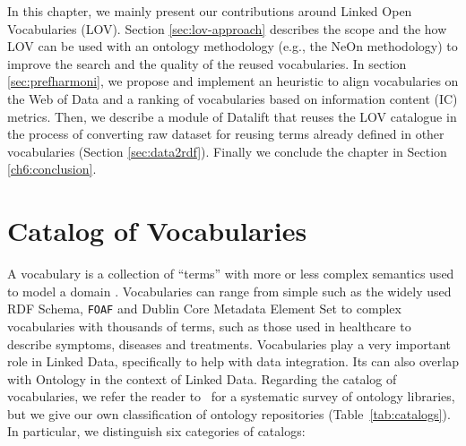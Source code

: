 In this chapter, we mainly present our contributions around Linked Open Vocabularies (LOV). Section \ref{sec:lov-approach} describes the scope and the how LOV can be used with an ontology methodology (e.g., the NeOn methodology) to improve the search and the quality of the reused vocabularies. In section \ref{sec:prefharmoni}, we propose and implement an heuristic to align vocabularies on the Web of Data and a ranking of vocabularies based on information content (IC) metrics. Then, we describe a module of Datalift that reuses the LOV catalogue in the process of converting raw dataset for reusing terms already defined in other vocabularies (Section \ref{sec:data2rdf}). Finally we  conclude the chapter in Section \ref{ch6:conclusion}.

\section{Catalog of Vocabularies}
\label{sec:catalog}
A vocabulary is a collection of ``terms'' with more or less complex semantics used to model a domain \cite{glossairegld}. Vocabularies can range from simple such as the widely used RDF Schema, \texttt{FOAF} and Dublin Core Metadata Element Set to complex vocabularies with thousands of terms, such as those used in healthcare to describe symptoms, diseases and treatments. Vocabularies play a very important role in Linked Data, specifically to help with data integration. Its can also overlap with Ontology in the context of Linked Data. Regarding the catalog of vocabularies, we refer the reader to~\cite{AquinJoWS12} for a systematic survey of ontology libraries, but we give our own classification of ontology repositories (Table~\ref{tab:catalogs}).
In particular, we distinguish six categories of catalogs:
